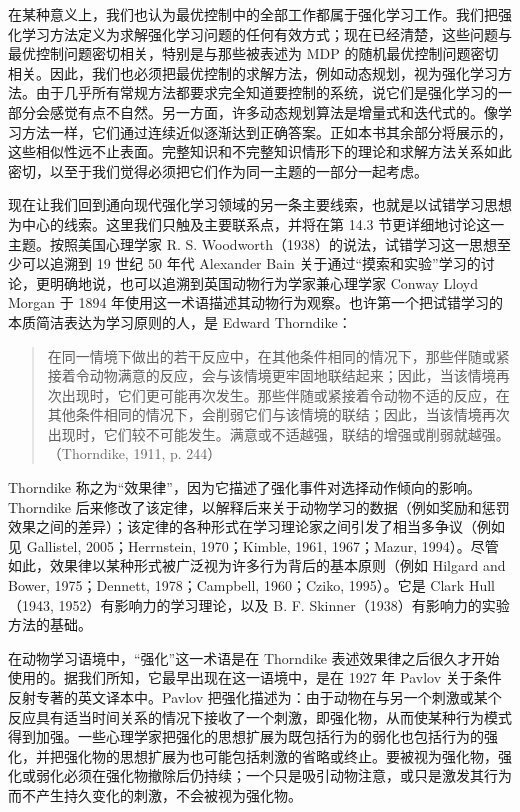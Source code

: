 \documentclass[UTF8,12pt,a4paper,fontset=fandol]{ctexart}
\begin{document}
在某种意义上，我们也认为最优控制中的全部工作都属于强化学习工作。我们把强化学习方法定义为求解强化学习问题的任何有效方式；现在已经清楚，这些问题与最优控制问题密切相关，特别是与那些被表述为 MDP 的随机最优控制问题密切相关。因此，我们也必须把最优控制的求解方法，例如动态规划，视为强化学习方法。由于几乎所有常规方法都要求完全知道要控制的系统，说它们是强化学习的一部分会感觉有点不自然。另一方面，许多动态规划算法是增量式和迭代式的。像学习方法一样，它们通过连续近似逐渐达到正确答案。正如本书其余部分将展示的，这些相似性远不止表面。完整知识和不完整知识情形下的理论和求解方法关系如此密切，以至于我们觉得必须把它们作为同一主题的一部分一起考虑。

现在让我们回到通向现代强化学习领域的另一条主要线索，也就是以试错学习思想为中心的线索。这里我们只触及主要联系点，并将在第 14.3 节更详细地讨论这一主题。按照美国心理学家 R. S. Woodworth（1938）的说法，试错学习这一思想至少可以追溯到 19 世纪 50 年代 Alexander Bain 关于通过“摸索和实验”学习的讨论，更明确地说，也可以追溯到英国动物行为学家兼心理学家 Conway Lloyd Morgan 于 1894 年使用这一术语描述其动物行为观察。也许第一个把试错学习的本质简洁表达为学习原则的人，是 Edward Thorndike：

\begin{quote}
在同一情境下做出的若干反应中，在其他条件相同的情况下，那些伴随或紧接着令动物满意的反应，会与该情境更牢固地联结起来；因此，当该情境再次出现时，它们更可能再次发生。那些伴随或紧接着令动物不适的反应，在其他条件相同的情况下，会削弱它们与该情境的联结；因此，当该情境再次出现时，它们较不可能发生。满意或不适越强，联结的增强或削弱就越强。（Thorndike, 1911, p. 244）
\end{quote}

Thorndike 称之为“效果律”，因为它描述了强化事件对选择动作倾向的影响。Thorndike 后来修改了该定律，以解释后来关于动物学习的数据（例如奖励和惩罚效果之间的差异）；该定律的各种形式在学习理论家之间引发了相当多争议（例如见 Gallistel, 2005；Herrnstein, 1970；Kimble, 1961, 1967；Mazur, 1994）。尽管如此，效果律以某种形式被广泛视为许多行为背后的基本原则（例如 Hilgard and Bower, 1975；Dennett, 1978；Campbell, 1960；Cziko, 1995）。它是 Clark Hull（1943, 1952）有影响力的学习理论，以及 B. F. Skinner（1938）有影响力的实验方法的基础。

在动物学习语境中，“强化”这一术语是在 Thorndike 表述效果律之后很久才开始使用的。据我们所知，它最早出现在这一语境中，是在 1927 年 Pavlov 关于条件反射专著的英文译本中。Pavlov 把强化描述为：由于动物在与另一个刺激或某个反应具有适当时间关系的情况下接收了一个刺激，即强化物，从而使某种行为模式得到加强。一些心理学家把强化的思想扩展为既包括行为的弱化也包括行为的强化，并把强化物的思想扩展为也可能包括刺激的省略或终止。要被视为强化物，强化或弱化必须在强化物撤除后仍持续；一个只是吸引动物注意，或只是激发其行为而不产生持久变化的刺激，不会被视为强化物。
\end{document}
